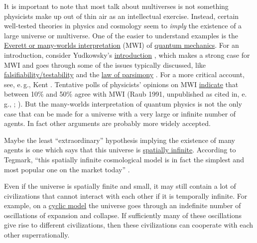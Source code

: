 It is important to note that most talk about multiverses is not
something physicists make up out of thin air as an intellectual
exercise. Instead, certain well-tested theories in physics and cosmology seem to
\emph{imply} the existence of a large universe or multiverse. One of the
easier to understand examples is the
\href{https://en.wikipedia.org/wiki/Many-worlds_interpretation}{Everett
or many-worlds interpretation} (MWI) of
\href{https://en.wikipedia.org/wiki/Quantum_mechanics}{quantum
mechanics}. For an introduction, consider Yudkowsky's
\href{https://wiki.lesswrong.com/wiki/The_Quantum_Physics_Sequence}{introduction}
\parencite*[chapter S]{Yudkowsky2015-tz},
which makes a strong case for MWI and goes through some of the issues typically discussed, like
\href{http://lesswrong.com/lw/q4/decoherence_is_falsifiable_and_testable/}{falsifiability/testability}
and the
\href{http://lesswrong.com/lw/pb/belief_in_the_implied_invisible/}{law
of parsimony}
\parencite{Tegmark2001-lm,Tegmark2007-mx,Vaidman2016-cv}.
For a more critical account, see, e.\,g., Kent
\citeyear{Kent1997-lm}. Tentative polls of physicists'
opinions on MWI
\href{https://en.wikipedia.org/wiki/Many-worlds_interpretation\#Polls}{indicate}
that between 10\% and 50\% agree with MWI (Raub 1991, unpublished as cited in, e.\,g.,
\cite[section 5, ``Nonrelativistic Quantum Mechanics is Deterministic'']{Tipler1994-di}; \cite{Tegmark1997-dd,Nielsen2004-lu,Emerson2006-go}).
But the many-worlds interpretation of quantum physics is not the only
case that can be made for a universe with a very large or infinite
number of agents. In fact other arguments are probably more widely
accepted.

Maybe the least ``extraordinary'' hypothesis implying the existence of
many agents is one which says that this universe is
\href{https://en.wikipedia.org/wiki/Shape_of_the_universe}{spatially
infinite}. According to Tegmark, ``this spatially infinite
cosmological model is in fact the simplest and most popular one on the
market today'' \citeyear{Tegmark2003-sl}.

Even if the universe is spatially finite and small, it may still contain
a lot of civilizations that cannot interact with each other if it is
temporally infinite. For example, on a
\href{https://en.wikipedia.org/wiki/Cyclic_model}{cyclic model}
the universe goes through an indefinite number of oscillations of
expansion and collapse. If sufficiently many of these oscillations give
rise to different civilizations, then these civilizations can cooperate
with each other superrationally.

